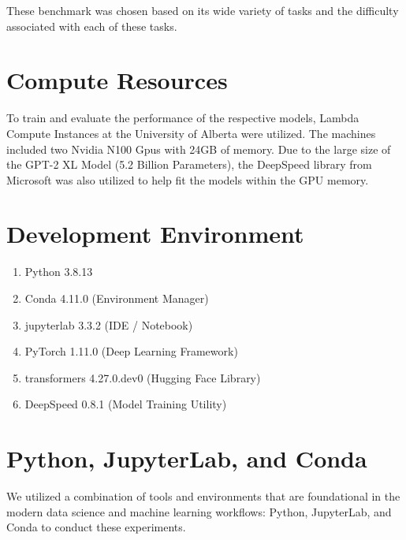 \documentclass[\main/thesis.tex]{subfiles}
\begin{document}
These benchmark was chosen based on its wide variety of tasks and the difficulty 
associated with each of these tasks. 


\section{Compute Resources}\label{sec:computeResources}
To train and evaluate the performance of the respective models, Lambda Compute Instances at the University of Alberta 
were utilized. The machines included two Nvidia N100 Gpus with 24GB of memory. Due to the large size of the GPT-2 XL 
Model (5.2 Billion Parameters), the DeepSpeed\cite{rajbhandari_zero_2020} library from Microsoft was also utilized to 
help fit the models within the GPU memory. 

\section{Development Environment}
\begin{enumerate}
    \item Python 3.8.13
    \item Conda 4.11.0 (Environment Manager)
    \item jupyterlab 3.3.2 (IDE / Notebook)
    \item PyTorch 1.11.0 (Deep Learning Framework)
    \item transformers 4.27.0.dev0 (Hugging Face Library)
    \item DeepSpeed 0.8.1 (Model Training Utility)
\end{enumerate}


\section{Python, JupyterLab, and Conda}\label{sec:python}

We utilized a combination of tools and environments that are foundational in the modern data science and machine 
learning workflows: Python, JupyterLab, and Conda to conduct these experiments. 
\end{document}
